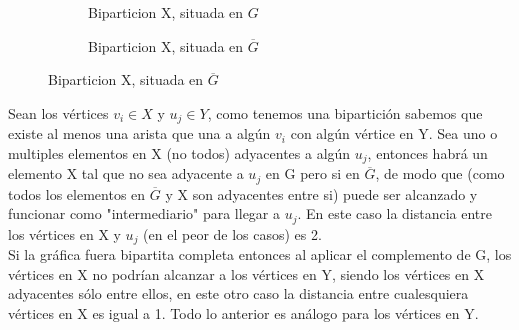 \documentclass[12pt]{article}
\begin{document}
\begin{figure}[h!]
    \begin{subfigure}{0.5\textwidth}
        \centering
        \caption{Biparticion X, situada en $G$}
    \end{subfigure}
    \begin{subfigure}{0.5\textwidth}
        \centering
        \caption{Biparticion X, situada en $\overline{G}$}
    \end{subfigure}
\end{figure}

Sean los vértices $v_i \in X$ y $u_j \in Y$, como tenemos una bipartición sabemos que existe al menos una arista que una a algún $v_i$ con algún vértice en Y. Sea uno o multiples elementos en X (no todos) adyacentes a algún $u_j$, entonces habrá un elemento X  tal que no sea adyacente a $u_j$ en G pero si en $\overline{G}$, de modo que (como todos los elementos en $\overline{G}$ y X son adyacentes entre si) puede ser alcanzado y funcionar como "intermediario" para llegar a $u_j$. En este caso la distancia entre los vértices en X y $u_j$ (en el peor de los casos) es 2.\\

Si la gráfica fuera bipartita completa entonces al  aplicar el complemento de G, los vértices en X no podrían alcanzar a los vértices en Y, siendo los vértices en X adyacentes sólo entre ellos, en este otro caso la distancia entre cualesquiera vértices en X es igual a 1. Todo lo anterior es análogo para los vértices en Y.\\
\end{document}
